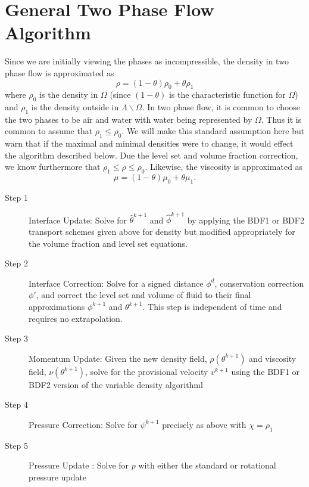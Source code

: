 \documentclass[letterpaper]{erdc}
\begin{document}
%
%
%
\section{General Two Phase Flow Algorithm}\label{sec:General2PFlowAlgorithm}

Since we are initially viewing the phases as incompressible, the
density in two phase flow is approximated as
\begin{equation}
  \rho = (1-\theta) \rho_0 + \theta \rho_1
\end{equation}
where $\rho_0$ is the density in $\Omega$ (since $(1-\theta)$ is the characteristic function for $\Omega$) and $\rho_1$ is the density outside in $\Lambda\backslash\Omega$. In two phase flow, it is common to choose the two phases to be air and water with water being represented by $\Omega$.  Thus it is common to assume that $\rho_1 \leq \rho_0$.  We will make this standard assumption here but warn that if the maximal and minimal densities were to change, it would effect the algorithm described below. Due the level set and volume fraction correction, we know furthermore that $\rho_1 \leq \rho \leq \rho_0$.
Likewise, the viscosity is approximated as 
\begin{equation}
  \mu = (1-\theta) \mu_0 + \theta \mu_1.
\end{equation}

\begin{description}
\item[Step 1] Interface Update: Solve for $\hat{\theta}^{k+1}$ and $\hat{\phi}^{k+1}$ by applying the BDF1 or BDF2 transport schemes given above for density but modified appropriately for the volume fraction and level set equations.
\item[Step 2] Interface Correction: Solve for a signed distance $\phi^d$, conservation correction $\phi'$, and correct the level set and volume of fluid to their final approximations $\phi^{k+1}$ and $\theta^{k+1}$. This step is independent of time and requires no extrapolation. 
\item [Step 3] Momentum Update: Given the new density field, $\rho(\theta^{k+1})$ and viscosity field, $\nu(\theta^{k+1})$, solve for the provisional velocity $v^{k+1}$ using the BDF1 or BDF2 version of the variable density algorithml
\item [Step 4] Pressure Correction: Solve for $\psi^{k+1}$ precisely as above with $\chi=\rho_1$
\item [Step 5] Pressure Update : Solve for $p$ with either the standard or rotational pressure update
\end{description}
\end{document}
